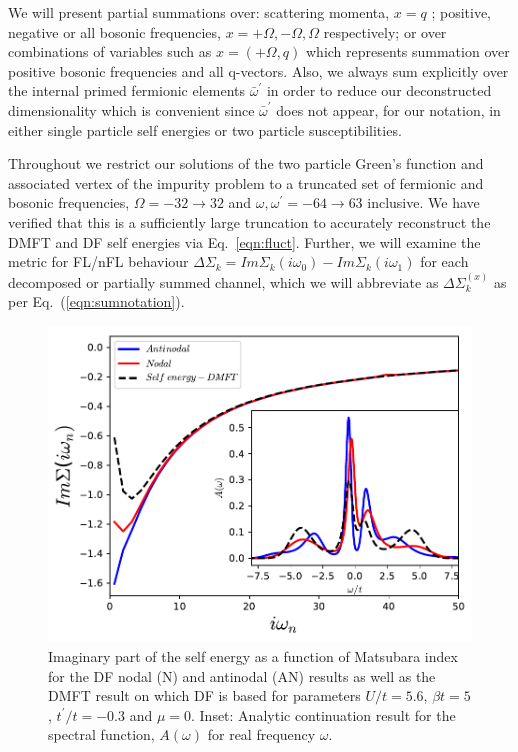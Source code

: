 \documentclass[twocolumn,notitlepage,prb,superscriptaddress,showpacs]{revtex4-1}
\begin{document}
We will present partial summations over: scattering momenta, $x=q$ ;  positive, negative or all bosonic frequencies, $x= +\Omega, -\Omega, \Omega$ respectively; or over combinations of variables such as $x=(+\Omega, q)$ which represents summation over positive bosonic frequencies and all q-vectors. Also, we always sum explicitly over the internal primed fermionic elements $\bar{\omega}^\prime$ in order to reduce our deconstructed dimensionality which is convenient since $\bar{\omega}^\prime$ does not appear, for our notation, in either single particle self energies or two particle susceptibilities.

Throughout we restrict our solutions of the two particle Green's function and associated vertex of the impurity problem to a truncated set of fermionic and bosonic frequencies, $\Omega= -32 \to 32$ and $\omega,\omega^\prime = -64 \to 63$ inclusive.  We have verified that this is a sufficiently large truncation to accurately reconstruct the  DMFT and DF self energies via Eq.~\eqref{eqn:fluct}.
Further, we will examine the metric for FL/nFL behaviour $\Delta \Sigma_k= Im\Sigma_k(i\omega_0)-Im\Sigma_k(i\omega_1)$ for each decomposed  or partially summed channel, which we will abbreviate as $\Delta \Sigma _{k}^{(x)}$ as per Eq.~(\ref{eqn:sumnotation}). 


\begin{figure}
\centering
    \includegraphics[width=0.95\linewidth]{selfenergy_spectral.pdf}
        \caption{\label{fig:selfedmft} Imaginary part of the self energy as a function of Matsubara index for the DF nodal (N) and antinodal (AN) results as well as the DMFT result on which DF is based for parameters $U/t=5.6$, $\beta t=5$, $t^\prime /t=-0.3$ and $\mu=0$.  Inset: Analytic continuation result for the spectral function, $A(\omega)$ for real frequency $\omega$.}
\end{figure}
\end{document}
